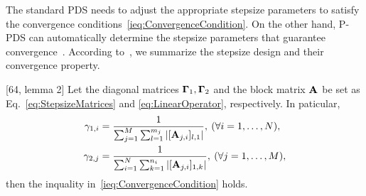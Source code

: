 The standard PDS needs to adjust the appropriate stepsize parameters to satisfy the convergence conditions~\eqref{ieq:ConvergenceCondition}. On the other hand, P-PDS can automatically determine the stepsize parameters that guarantee convergence~\cite{Pock2011PPDS,Naganuma2023PPDS}. According to~\cite{Pock2011PPDS}, we summarize the stepsize design and their convergence property.
\begin{lem}
	\label{lem:StepsizeParameters}
	[64, lemma 2] Let the diagonal matrices $\mathbf{\Gamma}_{1}, \mathbf{\Gamma}_{2}$ and the block matrix $\mathbf{A}_{}$ be set as Eq.~\eqref{eq:StepsizeMatrices} and \eqref{eq:LinearOperator}, respectively. In paticular,
	\begin{align}
	\label{eq:Preconditioners}
	\ScalarStepsize{1, \IndexPrimal} & = \frac{1}{\sum_{\IndexDual = 1}^{\NumVarDual} \sum_{\IndexVarDual = 1}^{\DimVarDual{\IndexDual}} | \MatrixBrackets[\LinOpPPDS{\IndexDual, \IndexPrimal}]{\IndexVarDual, 1} |} , \: (\forall \IndexPrimal = 1, \ldots, \NumVarPrimal), \notag \\
	\ScalarStepsize{2, \IndexDual} & = \frac{1}{\sum_{\IndexPrimal = 1}^{\NumVarPrimal} \sum_{\IndexVarPrimal = 1}^{\DimVarPrimal{\IndexPrimal}} | \MatrixBrackets[\LinOpPPDS{\IndexDual, \IndexPrimal}]{1, \IndexVarPrimal} |}, \: (\forall \IndexDual = 1, \ldots, \NumVarDual),
	\end{align}
	then the inquality in~\eqref{ieq:ConvergenceCondition} holds.
\end{lem}